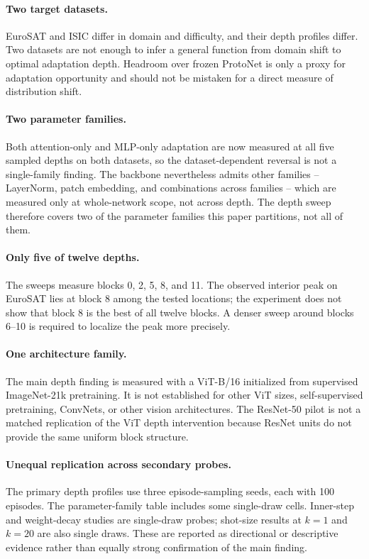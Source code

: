 \documentclass[11pt]{article}
\begin{document}
\paragraph{Two target datasets.} EuroSAT and ISIC differ in domain and difficulty, and their depth profiles differ. Two datasets are not enough to infer a general function from domain shift to optimal adaptation depth. Headroom over frozen ProtoNet is only a proxy for adaptation opportunity and should not be mistaken for a direct measure of distribution shift.

\paragraph{Two parameter families.} Both attention-only and MLP-only adaptation are now measured at all five sampled depths on both datasets, so the dataset-dependent reversal is not a single-family finding. The backbone nevertheless admits other families -- LayerNorm, patch embedding, and combinations across families -- which are measured only at whole-network scope, not across depth. The depth sweep therefore covers two of the parameter families this paper partitions, not all of them.

\paragraph{Only five of twelve depths.} The sweeps measure blocks 0, 2, 5, 8, and 11. The observed interior peak on EuroSAT lies at block 8 among the tested locations; the experiment does not show that block 8 is the best of all twelve blocks. A denser sweep around blocks 6--10 is required to localize the peak more precisely.

\paragraph{One architecture family.} The main depth finding is measured with a ViT-B/16 initialized from supervised ImageNet-21k pretraining. It is not established for other ViT sizes, self-supervised pretraining, ConvNets, or other vision architectures. The ResNet-50 pilot is not a matched replication of the ViT depth intervention because ResNet units do not provide the same uniform block structure.

\paragraph{Unequal replication across secondary probes.} The primary depth profiles use three episode-sampling seeds, each with 100 episodes. The parameter-family table includes some single-draw cells. Inner-step and weight-decay studies are single-draw probes; shot-size results at $k=1$ and $k=20$ are also single draws. These are reported as directional or descriptive evidence rather than equally strong confirmation of the main finding.
\end{document}
